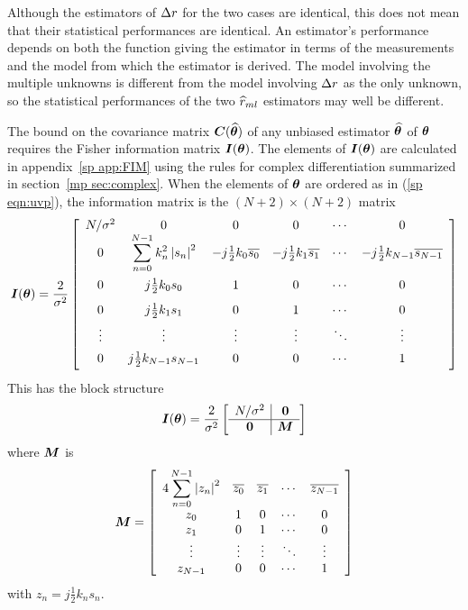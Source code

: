 Although the estimators of ${\Delta r}$ for the two cases are identical, this does
not mean that their statistical performances are identical.  An estimator's
performance depends on both the function giving the estimator in terms of
the measurements and the model from which the estimator is derived.  The
model involving the multiple unknowns is different from the model involving
${\Delta r}$ as the only unknown, so the statistical performances of the two $\widehat{r}_{ml}$
estimators may well be different.  

The \CR bound on the covariance matrix $\bm{C}(\widehat{\bm{\theta}})$ of any unbiased 
estimator $\widehat{\bm{\theta}}$ of $\bm{\theta}$ requires the Fisher information matrix 
$\bm{I}(\bm{\theta})$.  
The elements of $\bm{I}(\bm{\theta})$ are calculated in appendix~\ref{sp app:FIM}
using the rules for complex differentiation summarized in
section~\ref{mp sec:complex}.  When the elements of $\bm{\theta}$ are ordered
as in (\ref{sp eqn:uvp}), the information matrix is the $(N+2)\times(N+2)$ 
matrix
\begingroup
\def\te#1{-j\frac{1}{2}k_{#1}\conj{s_{#1}}\vphantom{\ds\frac{1}{1}}}
\def\be#1{j\frac{1}{2}k_{#1}s_{#1}\vphantom{\ds\frac{1}{1}}}
\def\re{\ds\sum_{n=0}^{N-1}k_n^2\left|s_n\right|^2}
\begin{equation}
\infmat{\uvp}=
\frac{2}{\nv}
\left[\begin{array}{cccccc}
N/\nv	&0	&0	&0	&\cdots	&0 	\\
0	&\re	&\te0	&\te1	&\cdots	&\te{N-1}\\
0	&\be{0}	&1	&0	&\cdots	&0	\\
0	&\be{1}	&0	&1	&\cdots	&0	\\
\vdots	&\vdots	&\vdots	&\vdots	&\ddots	&\vdots \\
0	&\be{N-1}&0	&0	&\cdots	&1
\end{array}\right]
\end{equation}
\endgroup
This has the block structure
\begin{equation}
\bm{I}(\bm{\theta})=\frac{2}{{\sigma^2}}\left[\begin{array}{c|c}
N/{\sigma^2} & \bm{0} \\
\hline
\bm{0} & \bm{M}
\end{array}\right]
\end{equation}
where $\bm{M}$ is
\begin{equation}
\def\z#1{z_{#1}}
\def\zc#1{\conj{z_{#1}}}
\def\zt{\ds\sum_{n=0}^{N-1}\left|z_n\right|^2}
\vect{M}=\left[\begin{array}{ccccc}
4\zt	&\zc0	&\zc1	&\cdots	&\zc{N-1}\\
\z0	&1	&0	&\cdots	&0	\\
\z1	&0	&1	&\cdots	&0	\\
\vdots	&\vdots	&\vdots	&\ddots	&\vdots \\
\z{N-1}&0	&0	&\cdots	&1
\end{array}\right]
\end{equation}
with $z_n=j\frac{1}{2}k_ns_n$.


